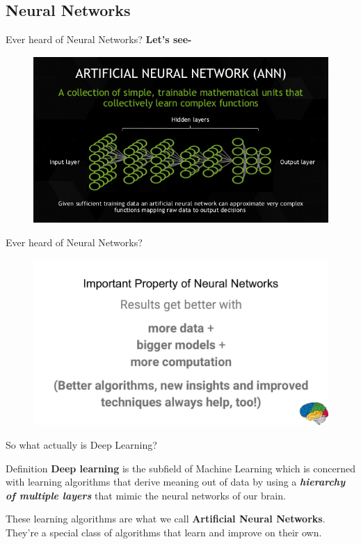 \documentclass[10pt]{beamer}
\begin{document}
	\subsection{Neural Networks}
	\begin{frame}[c]{Ever heard of Neural Networks?}
	\large{\textbf{Let's see-}}
		\begin{figure}
			\includegraphics[width=\linewidth,height=2.5in]{images/nn}
		\end{figure}
	\end{frame}
	\begin{frame}[c]{Ever heard of Neural Networks?}
	\begin{figure}
		\includegraphics[width=\linewidth]{images/prop_nn}
	\end{figure}
	\end{frame}
	\begin{frame}{So what actually is Deep Learning?}
		\begin{block}{Definition}
			\textbf{Deep learning} is the subfield of Machine Learning which is concerned with learning algorithms that derive meaning out of data by using a \textbf{\textit{hierarchy of multiple layers}} that \alert{mimic the neural networks of our brain}.
		\end{block}
		\bigskip
		These learning algorithms are what we call \textbf{Artificial Neural Networks}. They're a special class of algorithms that learn and improve on their own.
	\end{frame}	
\end{document}
